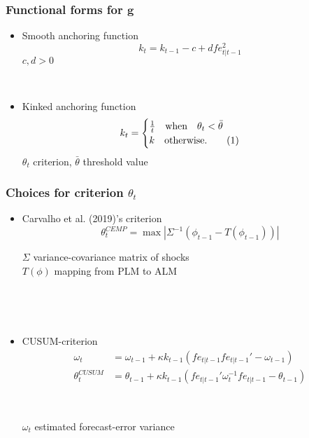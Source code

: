 \documentclass[11pt]{beamer}
\newcommand\numberthis{\addtocounter{equation}{1}\tag{\theequation}} %
\begin{document}
\begin{frame}[plain]  %
	\frametitle{Functional forms for $\mathbf{g}$}
	\label{g}
\begin{itemize}
\item Smooth anchoring function
\begin{equation}
k_t = k_{t-1} - c + d fe_{t|t-1}^2
\end{equation}
$c,d > 0$

\

\item Kinked anchoring function
 \begin{align*}
k_t & = \begin{cases} \frac{1}{t} \quad \text{when} \quad \theta_t < \bar{\theta}  \\ k \quad \text{otherwise.}\numberthis
\end{cases} 
\end{align*}
$\theta_t$ criterion, $\bar{\theta}$ threshold value

\end{itemize}

\vfill 
\hyperlink{anchoring1}{}	

\end{frame}

\begin{frame}[plain]  %
	\frametitle{Choices for criterion $\theta_t$}
	\label{g}
\begin{itemize}
\item Carvalho et al. (2019)'s criterion  
\begin{equation}
\theta_t^{CEMP} = \max | \Sigma^{-1} ( \phi_{t-1} - T(\phi_{t-1})) |
\end{equation}


$\Sigma$ variance-covariance matrix of shocks \\
$T(\phi)$ mapping from PLM to ALM

\

\

\item CUSUM-criterion
\begin{align}
\omega_t & =  \omega_{t-1} + \kappa k_{t-1}(fe_{t|t-1} fe_{t|t-1}'  -\omega_{t-1})\\
\theta_t^{CUSUM} & =  \theta_{t-1} + \kappa k_{t-1}(fe_{t|t-1}'\omega_t^{-1}fe_{t|t-1} -\theta_{t-1})
\end{align}

\

$\omega_t$ estimated forecast-error variance
\end{itemize}




\vfill

\hyperlink{anchoring1}{}	


\end{frame}
\end{document}

